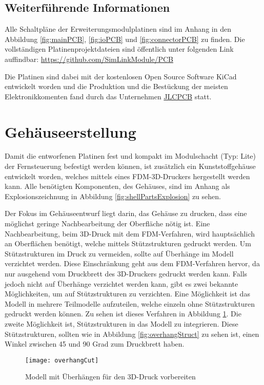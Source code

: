 \subsection{Weiterführende Informationen}

Alle Schaltpläne der Erweiterungsmodulplatinen sind im Anhang in den Abbildung \ref{fig:mainPCB}, \ref{fig:ioPCB} und  \ref{fig:connectorPCB} zu finden. Die vollständigen Platinenprojektdateien sind öffentlich unter folgenden Link auffindbar: \url{https://github.com/SimLinkModule/PCB}

Die Platinen sind dabei mit der kostenlosen Open Source Software KiCad \cite{aboutkicad} entwickelt worden und die Produktion und die Bestückung der meisten Elektronikkomenten fand durch das Unternehmen \href{https://jlcpcb.com/}{JLCPCB} statt.

\section{Gehäuseerstellung}
\label{section:caseImplementation}
Damit die entworfenen Platinen fest und kompakt im Modulschacht (Typ: Lite) der Fernsteuerung befestigt werden können, ist zusätzlich ein Kunststoffgehäuse entwickelt worden, welches mittels eines \ac{FDM}-3D-Druckers hergestellt werden kann. Alle benötigten Komponenten, des Gehäuses, sind im Anhang als Explosionszeichnung in Abbildung \ref{fig:shellPartsExplosion} zu sehen.

Der Fokus im Gehäuseentwurf liegt darin, das Gehäuse zu drucken, dass eine möglichst geringe Nachbearbeitung der Oberfläche nötig ist. Eine Nachbearbeitung, beim 3D-Druck mit dem \ac{FDM}-Verfahren, wird hauptsächlich an Oberflächen benötigt, welche mittels Stützstrukturen gedruckt werden. Um Stützstrukturen im Druck zu vermeiden, sollte auf Überhänge im Modell verzichtet werden. Diese Einschränkung geht aus dem \ac{FDM}-Verfahren hervor, da nur ausgehend vom Druckbrett des 3D-Druckers gedruckt werden kann. Falls jedoch nicht auf Überhänge verzichtet werden kann, gibt es zwei bekannte Möglichkeiten, um auf Stützstrukturen zu verzichten. Eine Möglichkeit ist das Modell in mehrere Teilmodelle aufzuteilen, welche einzeln ohne Stützstrukturen gedruckt werden können. Zu sehen ist dieses Verfahren in Abbildung \ref{fig:overhangCut}. Die zweite Möglichkeit ist, Stützstrukturen in das Modell zu integrieren. Diese Stützstrukturen, sollten wie in Abbildung \ref{fig:overhangStruct} zu sehen ist, einen Winkel zwischen 45 und 90 Grad zum Druckbrett haben.

\begin{figure}[h]
    \centering
    \texttt{[image: overhangCut]}
    \caption{Modell mit Überhängen für den 3D-Druck vorbereiten}
    \label{fig:overhangCut}
\end{figure}

